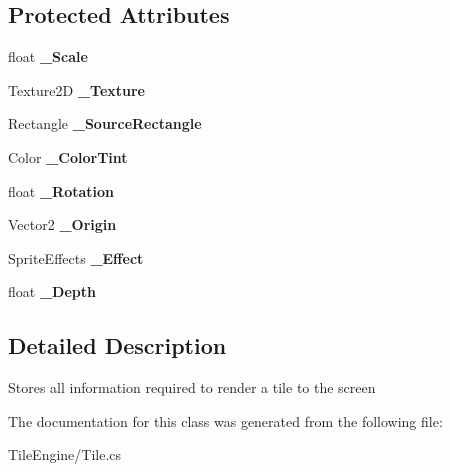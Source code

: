 \subsection*{Protected Attributes}
\begin{DoxyCompactItemize}
\item 
\hypertarget{class_tile_engine_1_1_tile_a3af1f4f1805b8b2bcd76ca550782ae55}{float {\bfseries \-\_\-\-Scale}}\label{d6/d07/class_tile_engine_1_1_tile_a3af1f4f1805b8b2bcd76ca550782ae55}

\item 
\hypertarget{class_tile_engine_1_1_tile_a0b1c2c935ededa1553ce38123605a62e}{Texture2\-D {\bfseries \-\_\-\-Texture}}\label{d6/d07/class_tile_engine_1_1_tile_a0b1c2c935ededa1553ce38123605a62e}

\item 
\hypertarget{class_tile_engine_1_1_tile_a8f440ad4fabaa0d462678303a7db6899}{Rectangle {\bfseries \-\_\-\-Source\-Rectangle}}\label{d6/d07/class_tile_engine_1_1_tile_a8f440ad4fabaa0d462678303a7db6899}

\item 
\hypertarget{class_tile_engine_1_1_tile_aadf2ea72c51446dbf3bac276d0f98de7}{Color {\bfseries \-\_\-\-Color\-Tint}}\label{d6/d07/class_tile_engine_1_1_tile_aadf2ea72c51446dbf3bac276d0f98de7}

\item 
\hypertarget{class_tile_engine_1_1_tile_a42d3f7d694c7a8422da6a9186a8e42a2}{float {\bfseries \-\_\-\-Rotation}}\label{d6/d07/class_tile_engine_1_1_tile_a42d3f7d694c7a8422da6a9186a8e42a2}

\item 
\hypertarget{class_tile_engine_1_1_tile_ade1613a00f6d458c497b8ddb3d3afffd}{Vector2 {\bfseries \-\_\-\-Origin}}\label{d6/d07/class_tile_engine_1_1_tile_ade1613a00f6d458c497b8ddb3d3afffd}

\item 
\hypertarget{class_tile_engine_1_1_tile_a8b2ca996f09db53cefd26d7ec7ad83a3}{Sprite\-Effects {\bfseries \-\_\-\-Effect}}\label{d6/d07/class_tile_engine_1_1_tile_a8b2ca996f09db53cefd26d7ec7ad83a3}

\item 
\hypertarget{class_tile_engine_1_1_tile_a0b460d5863d5b52b639d55a70b9ecb3e}{float {\bfseries \-\_\-\-Depth}}\label{d6/d07/class_tile_engine_1_1_tile_a0b460d5863d5b52b639d55a70b9ecb3e}

\end{DoxyCompactItemize}


\subsection{Detailed Description}
Stores all information required to render a tile to the screen 



The documentation for this class was generated from the following file\-:\begin{DoxyCompactItemize}
\item 
Tile\-Engine/Tile.\-cs\end{DoxyCompactItemize}
